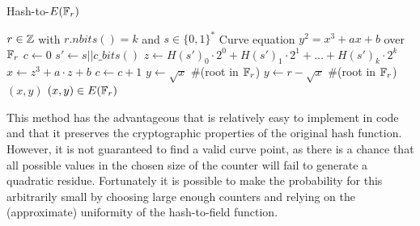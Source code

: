 \begin{algorithm}\caption{Hash-to-$E(\mathbb{F}_r)$}
\label{alg_projective_group_law}
\begin{algorithmic}[0]
\Require $r \in \mathbb{Z}$ with $r.nbits()=k$ and $s\in\{0,1\}^*$
\Require Curve equation $y^2 = x^3 + ax +b$ over $\mathbb{F}_r$
\State $c \gets 0$
\Repeat
\State $s' \gets s||c\_bits()$
\State $z \gets H(s')_0\cdot 2^0 + H(s')_1\cdot 2^1 + \ldots + H(s')_{k}\cdot 2^{k}$
\State $x\gets z^3 + a\cdot z + b$
\State $c\gets c+1$
\State $y \gets \sqrt{x}$ \#(root in $\mathbb{F}_r$)
\Else 
\State $y \gets r-\sqrt{x}$ \#(root in $\mathbb{F}_r$)
\EndIf
\State {} $(x,y)$
\EndProcedure
\Ensure $(x,y)\in E(\mathbb{F}_r)$
\end{algorithmic}
\end{algorithm}

This method has the advantageous that is relatively easy to implement in code and that it preserves the cryptographic properties of the original hash function. However, it is not guaranteed to find a valid curve point, as there is a chance that all possible values in the chosen size of the counter will fail to generate a quadratic residue. Fortunately it is possible to make the probability for this arbitrarily small by choosing large enough counters and relying on the (approximate) uniformity of the hash-to-field function. 



